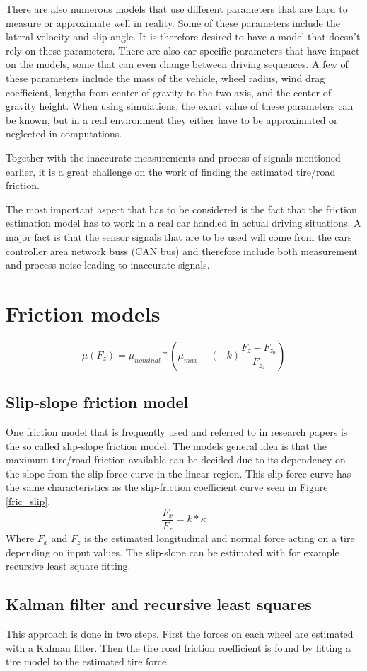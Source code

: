 There are also numerous models that use different parameters that are hard to measure or approximate well in reality. Some of these parameters include the lateral velocity and slip angle. It is therefore desired to have a model that doesn't rely on these parameters. There are also car specific parameters that have impact on the models, some that can even change between driving sequences. A few of these parameters include the mass of the vehicle, wheel radius, wind drag coefficient, lengths from center of gravity to the two axis, and the center of gravity height. When using simulations, the exact value of these parameters can be known, but in a real environment they either have to be approximated or neglected in computations.

Together with the inaccurate measurements and process of signals mentioned earlier, it is a great challenge on the work of finding the estimated tire/road friction.  


The most important aspect that has to be considered is the fact that the friction estimation model has to work in a real car handled in actual driving situations. A major fact is that the sensor signals that are to be used  will come from the cars controller area network buss (CAN bus) and therefore include both measurement and process noise leading to inaccurate signals. 

\section{Friction models}

\begin{equation}
\mu(F_{z})=\mu_{nominal}*(\mu_{max} + (-k)\frac{F_{z} - F_{z_{0}}}{F_{z_{0}}})
\end{equation}

\subsection{Slip-slope friction model}

One friction model that is frequently used and referred to in research papers is the so called slip-slope friction model. The models general idea is that the maximum tire/road friction available can be decided due to its dependency on the slope from the slip-force curve in the linear region. This slip-force curve has the same characteristics as the slip-friction coefficient curve seen in Figure \ref{fric_slip}. 
\begin{equation}
	\dfrac{F_{x}}{F_{z}} = k*\kappa
\end{equation}
Where $ F_{x} $ and $ F_{z} $ is the estimated longitudinal and normal force acting on a tire depending on input values. The slip-slope can be estimated with for example recursive least square fitting.


\subsection{Kalman filter and recursive least squares}
This approach is done in two steps. First the forces on each wheel are estimated with a Kalman filter. Then the tire road friction coefficient is found by fitting a tire model to the estimated tire force.